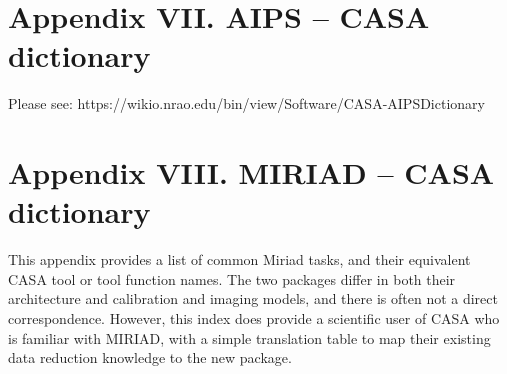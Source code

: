 \chapter{Appendix VII. AIPS -- CASA dictionary}
\label{chapter:app.7}

Please see: 
https://wikio.nrao.edu/bin/view/Software/CASA-AIPSDictionary

\chapter{Appendix VIII. MIRIAD -- CASA dictionary}
\label{chapter:app.8}

This appendix provides a list of common Miriad tasks, and their
equivalent CASA tool or tool function names. The two packages differ
in both their architecture and calibration and imaging models, and
there is often not a direct correspondence. However, this index does
provide a scientific user of CASA who is familiar with MIRIAD, with
a simple translation table to map their existing data reduction
knowledge to the new package.


